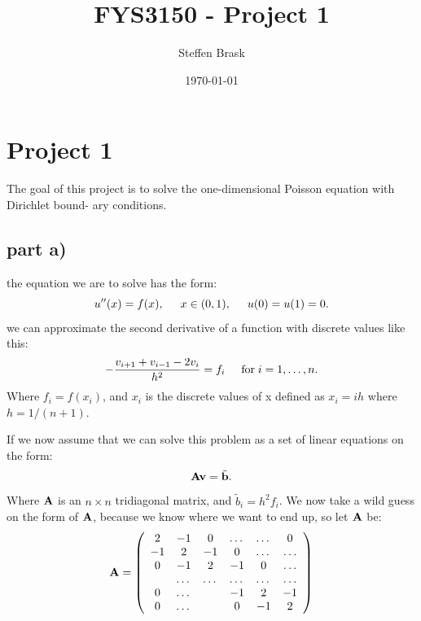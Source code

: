 \documentclass[norsk,a4paper,12pt]{article}
\title{FYS3150 - Project 1}
\author{Steffen Brask}
\date{\today}
\begin{document}
\maketitle



\newpage


\section*{Project 1}

The goal of this project is to solve the one-dimensional Poisson equation with Dirichlet bound-
ary conditions.

\subsection*{part a)}

the equation we are to solve has the form:
\begin{equation}
 \-u''(x) = f(x), \hspace{0.5cm} x\in(0,1), \hspace{0.5cm} u(0) = u(1) = 0.
\end{equation}
we can approximate the second derivative of a function with discrete values like this:
\begin{equation}
 -\frac{v_{i+1}+v_{i-1}-2v_i}{h^2} = f_i  \hspace{0.5cm} \mathrm{for} \hspace{0.1cm} i=1,\dots, n.
\end{equation}
Where $f_i=f(x_i)$, and $x_i$ is the discrete values of x defined as $x_i=ih$ where $h=1/(n+1)$.  \newline

If we now assume that we can solve this problem as a set of linear equations on the form:
\begin{equation}
 {\bf A}{\bf v} = \tilde{{\bf b}}.
\end{equation}
Where ${\bf A}$ is an $n\times n$  tridiagonal matrix, and $\tilde{b}_i=h^2f_i$. We now take a wild guess on the form 
of ${\bf A}$, because we know where we want to end up, so let ${\bf A}$ be:
\begin{equation}
    {\bf A} = \left(\begin{array}{cccccc}
                           2& -1& 0 &\dots   & \dots &0 \\
                           -1 & 2 & -1 &0 &\dots &\dots \\
                           0&-1 &2 & -1 & 0 & \dots \\
                           & \dots   & \dots &\dots   &\dots & \dots \\
                           0&\dots   &  &-1 &2& -1 \\
                           0&\dots    &  & 0  &-1 & 2 \\
                      \end{array} \right)
\end{equation}
\end{document}
